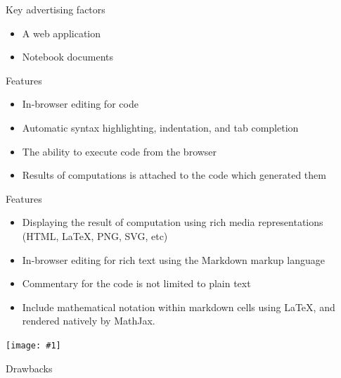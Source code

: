 \documentclass[
  11pt,
  ignorenonframetext,
  aspectratio=169]{beamer}
\providecommand{\tightlist}{%
  \setlength{\itemsep}{0pt}\setlength{\parskip}{0pt}}
\newcommand{\fullframegraphic}[1]{
  \texttt{[image: \#1]}
}
\newlength\beamerleftmargin
\begin{document}
\begin{frame}{Key advertising factors}
\protect\hypertarget{key-advertising-factors}{}
\begin{itemize}
\tightlist
\item
  A web application
\end{itemize}

\begin{itemize}
\tightlist
\item
  Notebook documents
\end{itemize}
\end{frame}

\begin{frame}{Features}
\protect\hypertarget{features}{}
\begin{itemize}
\tightlist
\item
  In-browser editing for code
\item
  Automatic syntax highlighting, indentation, and tab completion
\item
  The ability to execute code from the browser
\item
  Results of computations is attached to the code which generated them
\end{itemize}
\end{frame}

\begin{frame}{Features}
\protect\hypertarget{features-1}{}
\begin{itemize}
\tightlist
\item
  Displaying the result of computation using rich media representations
  (HTML, LaTeX, PNG, SVG, etc)
\item
  In-browser editing for rich text using the Markdown markup language
\item
  Commentary for the code is not limited to plain text
\item
  Include mathematical notation within markdown cells using LaTeX, and
  rendered natively by MathJax.
\end{itemize}
\end{frame}

\begin{frame}{}
\protect\hypertarget{section-6}{}
\vspace*{-10.6mm}\hspace*{-\beamerleftmargin}\hspace*{-1.5mm}
\fullframegraphic{"../captures/Capture d’écran (1)"}
\end{frame}

\begin{frame}{Drawbacks}
\protect\hypertarget{drawbacks}{}
\end{frame}
\end{document}
